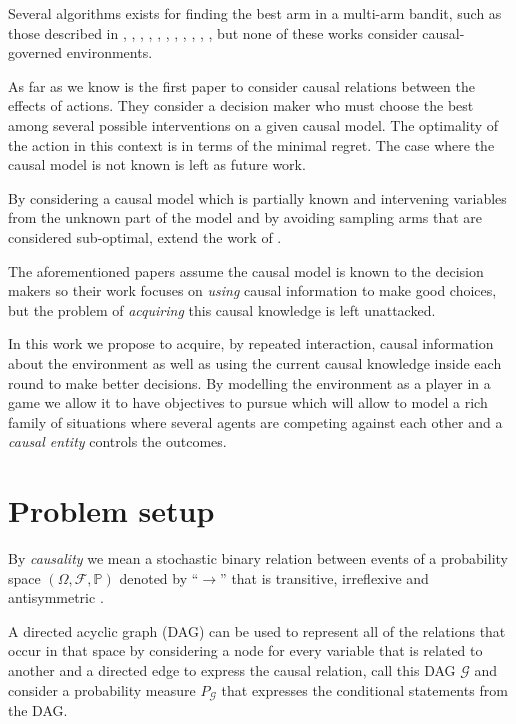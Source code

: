\documentclass{article}
\begin{document}
Several algorithms exists for finding the best arm in a multi-arm bandit, such as those described in \cite{bubeck2009pure}, \cite{audibert2010best}, \cite{gabillon2012best}, \cite{agarwal2014taming} , \cite{jamieson2014lil},  \cite{jamieson2014best},  \cite{ortega2014generalized}, \cite{chen2015optimal}, \cite{carpentier2016tight}, \cite{russo2016simple},  \cite{kaufmann2016complexity}, but none of these works consider causal-governed environments.

As far as we know \cite{lattimoreNIPS2016} is the first paper to consider causal relations between the effects of actions. They consider a decision maker who must choose the best among several possible interventions on a given causal model. The optimality of the action in this context is in terms of the minimal regret. The case where the causal model is not known is left as future work.

By considering a causal model which is partially known and intervening variables from the unknown part of the model and by avoiding sampling arms that are considered sub-optimal, \cite{sen2017identifying} extend the work of \cite{lattimoreNIPS2016}.

The aforementioned papers assume the causal model is known to the decision makers so their work focuses on \textit{using} causal information to make good choices, but the problem of \textit{acquiring} this causal knowledge is left unattacked.

In this work we propose to acquire, by repeated interaction, causal information about the environment as well as using the current causal knowledge inside each round to make better decisions. By modelling the environment as a player in a game we allow it to have objectives to pursue which will allow to model a rich family of situations where several agents are competing against each other and a \textit{causal entity} controls the outcomes. 

\section{Problem setup}{\label{problem_setup}}
By \textit{causality} we mean a stochastic binary relation between events of a probability space $(\Omega, \mathcal{F}, \mathbb{P})$ denoted by $“\to”$ that is transitive, irreflexive and antisymmetric \cite{spirtes2000causation}. 

A directed acyclic graph (DAG) can be used to represent all of the relations that occur in that space by considering a node for every variable that is related to another and a directed edge to express the causal relation, call this DAG $\mathcal{G}$ and consider a probability measure $P_{\mathcal{G}}$ that expresses the conditional statements from the DAG. 
\end{document}
